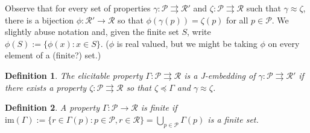 \documentclass[12pt]{article}
\renewcommand{\P}{\mathcal{P}}
\newcommand{\R}{\mathcal{R}}
\newcommand{\toto}{\rightrightarrows}
\newcommand{\im}{\text{im}}
\newcommand{\strip}{\mathrm{strip}}
\newtheorem{definition}{Definition}
\newtheorem{conjecture}{Conjecture}
\begin{document}
Observe that for every set of properties $\gamma: \P \toto \R'$ and $\zeta: \P \toto \R$ such that $\gamma \approx \zeta$, there is a bijection $\phi:\R' \to \R$ so that $\phi(\gamma(p)) = \zeta(p)$ for all $p \in \P$.
We slightly abuse notation and, given the finite set $S$, write $\phi(S) := \{\phi(x) : x \in S \}$.
($\phi$ is real valued, but we might be taking $\phi$ on every element of a (finite?) set.)

\begin{definition}
	The elicitable property $\Gamma:\P\toto \R$ is a \emph{J-embedding} of $\gamma: \P \toto \R'$ if there exists a property $\zeta : \P \toto \R$ so that $\zeta \preceq \Gamma$ and $\gamma \approx \zeta$.
\end{definition}

%
%
%

\begin{definition}
A property $\Gamma: \P \to \R$ is \emph{finite} if $\im(\Gamma) := \{r\in\Gamma(p) : p\in\P, r \in \R \} = \bigcup_{p\in\P} \Gamma(p)$ is a finite set.
\end{definition}
\end{document}
